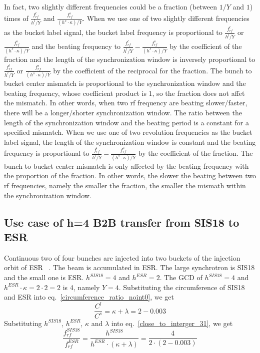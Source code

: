 In fact, two slightly different frequencies could be a fraction (between $1/Y$ and $1$) times of $\frac{f_{\mathit{rf}}^{l}}{h^l/Y}$ and $\frac{f_{\mathit{rf}}^{s}}{(h^s\cdot \kappa)/Y}$. When we use one of two slightly different frequencies as the bucket label signal, the bucket label frequency is proportional to $\frac{f_{\mathit{rf}}^{l}}{h^l/Y}$ or $\frac{f_{\mathit{rf}}^{s}}{(h^s\cdot \kappa)/Y}$ and the beating frequency to $\frac{f_{\mathit{rf}}^{l}}{h^l/Y}-\frac{f_{\mathit{rf}}^{s}}{(h^s\cdot \kappa)/Y}$ by the coefficient of the fraction and the length of the synchronization window is inversely proportional to $\frac{f_{\mathit{rf}}^{l}}{h^l/Y}$ or $\frac{f_{\mathit{rf}}^{s}}{(h^s\cdot \kappa)/Y}$ by the coefficient of the reciprocal for the fraction. The bunch to bucket center mismatch is proportional to the synchronization window and the beating frequency, whose coefficient product is $1$, so the fraction does not affet the mismatch. In other words, when two rf frequency are beating slower/faster, there will be a longer/shorter synchronization window. The ratio between the length of the synchronization window and the beating period is a constant for a specified mismatch. When we use one of two revolution frequencies as the bucket label signal, the length of the synchronization window is constant and the beating frequency is proportional to $\frac{f_{\mathit{rf}}^{l}}{h^l/Y}-\frac{f_{\mathit{rf}}^{s}}{(h^s\cdot \kappa)/Y}$ by the coefficient of the fraction. The bunch to bucket center mismatch is only affected by the beating frequency with the proportion of the fraction. In other words, the slower the beating between two rf frequencies, namely the smaller the fraction, the smaller the mismath within the synchronization window.

\subsection{Use case of h=4 B2B transfer from SIS18 to ESR} 
Continuous two of four bunches are injected into two buckets of the injection orbit of ESR ~\cite{steck_demonstration_2011}. The beam is accumulated in ESR. The large synchrotron is SIS18 and the small one is ESR. $h^{\mathit{SIS18}}=4$ and $h^{\mathit{ESR}}=2$. The GCD of $h^{\mathit{SIS18}}=4$ and $h^{\mathit{ESR}}\cdot \kappa=2\cdot 2=2$ is 4, namely $Y=4$. Substituting the circumference of SIS18 and ESR into eq.~\ref{circumference_ratio_noint0}, we get
\begin{equation}
\frac{C^l}{C^s}=\kappa + \lambda =2-0.003
\end{equation}
Substituting $h^{\mathit{SIS18}}$, $h^{\mathit{ESR}}$, $\kappa$ and $\lambda$ into eq.~\ref{close_to_interger_31}, we get
\begin{equation}
\frac {f_{\mathit{rf}}^{\mathit{SIS18}}}{f_{\mathit{rf}}^{\mathit{ESR}}}= \frac{h^{\mathit{SIS18}}}{h^{\mathit{ESR}} \cdot (\kappa+ \lambda)}=\frac {4}{2 \cdot(2-0.003)}
\end{equation}

